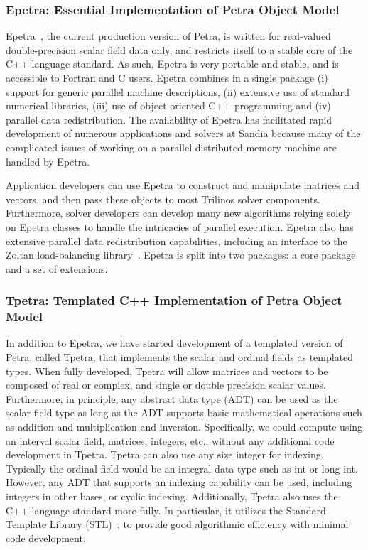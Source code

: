 \documentclass[acmtoms,acmnow]{acmtrans2m}
\begin{document}
\subsubsection{Epetra: Essential Implementation of Petra Object Model}

Epetra~\cite{Epetra-User-Guide}, the current production version of Petra,
 is written for real-valued double-precision scalar field data only, and
restricts itself to a stable core
of the C++ language standard.  As such, Epetra is very portable and 
stable, and  
is accessible to Fortran and C users.  
Epetra combines in a single package (i) support 
for generic parallel
machine descriptions, (ii) extensive use of standard numerical 
libraries, (iii) use of object-oriented C++ programming and (iv) parallel data 
redistribution.  The availability of Epetra has 
facilitated rapid development
of numerous applications and solvers at Sandia because many of the 
complicated issues of
working on a parallel distributed memory machine are handled by Epetra.

Application developers can use Epetra to construct and manipulate matrices
and vectors, and then pass these objects to most Trilinos solver components.
Furthermore, solver developers can develop many new algorithms relying 
solely on Epetra classes to handle the intricacies of parallel execution.  
Epetra also has extensive parallel data  redistribution capabilities, 
including an interface to the Zoltan load-balancing
library~\cite{zoltan-ug}.  Epetra is split into two packages:  a core
package and a set of extensions.

\subsubsection{Tpetra: Templated C++ Implementation of Petra Object Model}

In addition to Epetra, we have started development of a templated 
version of Petra, called Tpetra, that implements the scalar and 
ordinal fields as templated types.  When fully developed, Tpetra 
will allow matrices and vectors to be composed of real or complex, 
and single or double precision scalar values.  Furthermore, in 
principle, any abstract data type (ADT) can be used as the scalar 
field type as long as the ADT supports basic mathematical operations 
such as addition and multiplication and inversion. Specifically, we 
could compute using an interval scalar field, matrices, integers, etc., 
without any additional code development in Tpetra.  Tpetra can also 
use any size integer for indexing.  Typically the ordinal field would 
be an integral data type such as int or long int.  However, any ADT 
that supports an indexing capability can be used, including integers in 
other bases, or cyclic indexing. Additionally, Tpetra also uses the 
C++ language standard more fully.  In particular, it utilizes the 
Standard Template Library (STL)~\cite{Stroustrup}, to provide good 
algorithmic efficiency with minimal code development.
\end{document}
